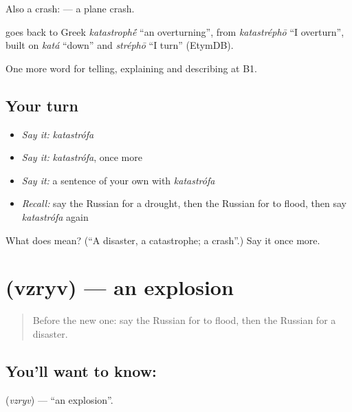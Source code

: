 Also a crash: \emph{} — a plane crash.

\begin{cousinweb}
\emph{} goes back to Greek \emph{katastroph\'{\={e}}} \textquotedblleft{}an overturning\textquotedblright{}, from \emph{katastréphō} \textquotedblleft{}I overturn\textquotedblright{}, built on \emph{katá} \textquotedblleft{}down\textquotedblright{} and \emph{stréphō} \textquotedblleft{}I turn\textquotedblright{} (EtymDB).
\end{cousinweb}

\begin{grammarlens}[title={What you've built}]
One more word for telling, explaining and describing at B1.
\end{grammarlens}

\subsection*{Your turn}
\begin{itemize}
\raggedright
  \item \emph{Say it:} \emph{katastrófa}
  \item \emph{Say it:} \emph{katastrófa}, once more
  \item \emph{Say it:} a sentence of your own with \emph{katastrófa}
  \item \emph{Recall:} say the Russian for a drought, then the Russian for to flood, then say \emph{katastrófa} again
\end{itemize}

\begin{tcolorbox}[breakable,colback=teal!4,colframe=teal!35!black,title={Before you move on}]
What does  mean? (\textquotedblleft{}A disaster, a catastrophe; a crash\textquotedblright{}.) Say it once more.
\end{tcolorbox}
\section[\texorpdfstring{\ru{взрыв} (vzryv)}{взрыв (vzryv)}]{ (vzryv) — an explosion}

\label{lesson:RU-C301-vzryv}



\begin{quote}
Before the new one: say the Russian for to flood, then the Russian for a disaster.
\end{quote}

\subsection*{You'll want to know: }
\textbf{} (\emph{vzryv}) — \textquotedblleft{}an explosion\textquotedblright{}.

